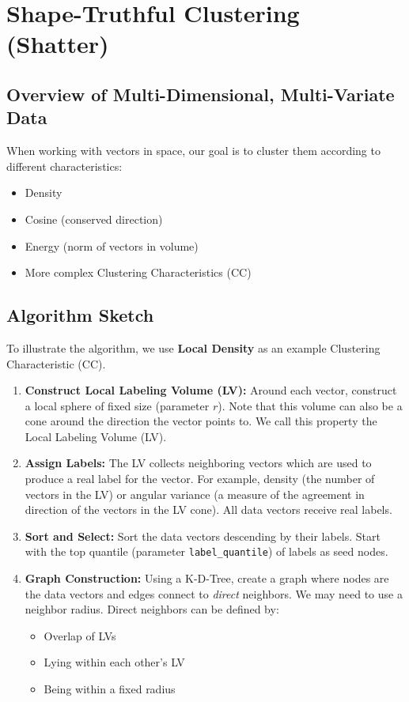 \section{Shape-Truthful Clustering (Shatter)}

\subsection{Overview of Multi-Dimensional, Multi-Variate Data}
When working with vectors in space, our goal is to cluster them according to different characteristics:
\begin{itemize}
    \item Density
    \item Cosine (conserved direction)
    \item Energy (norm of vectors in volume)
    \item More complex Clustering Characteristics (CC)
\end{itemize}

\subsection{Algorithm Sketch}
To illustrate the algorithm, we use \textbf{Local Density} as an example Clustering Characteristic (CC).

\begin{enumerate}
    \item \textbf{Construct Local Labeling Volume (LV):} Around each vector, construct a local sphere of fixed size (parameter $r$). Note that this volume can also be a cone around the direction the vector points to. We call this property the Local Labeling Volume (LV).
    \item \textbf{Assign Labels:} The LV collects neighboring vectors which are used to produce a real label for the vector. For example, density (the number of vectors in the LV) or angular variance (a measure of the agreement in direction of the vectors in the LV cone). All data vectors receive real labels.
    \item \textbf{Sort and Select:} Sort the data vectors descending by their labels. Start with the top quantile (parameter \texttt{label\_quantile}) of labels as seed nodes.
    \item \textbf{Graph Construction:} Using a K-D-Tree, create a graph where nodes are the data vectors and edges connect to \textit{direct} neighbors. We may need to use a neighbor radius. Direct neighbors can be defined by:
    \begin{itemize}
        \item Overlap of LVs
        \item Lying within each other's LV
        \item Being within a fixed radius
    \end{itemize}
\end{enumerate}

